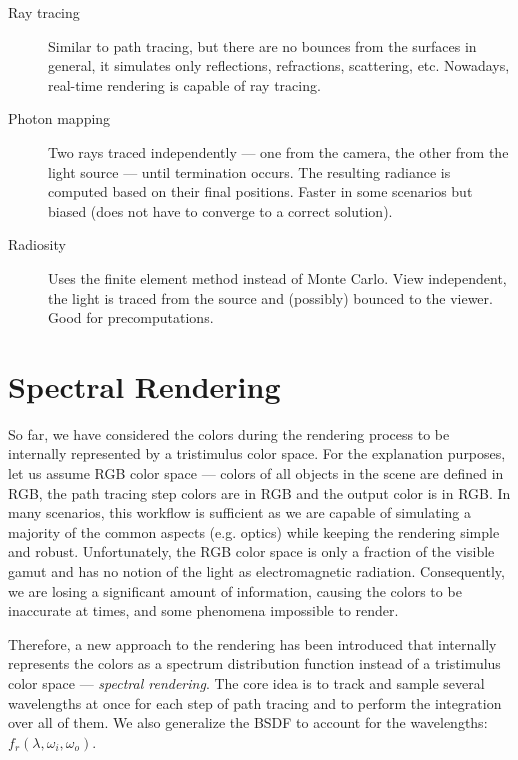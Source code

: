 \begin{description}
	\item[Ray tracing~\cite{glassner1989introduction}] Similar to path tracing, but there are no bounces from the surfaces in general, it simulates only reflections, refractions, scattering, etc. Nowadays, real-time rendering is capable of ray tracing.
	\item[Photon mapping~\cite{jensen2001realistic}] Two rays traced independently --- one from the camera, the other from the light source --- until termination occurs. The resulting radiance is computed based on their final positions. Faster in some scenarios but biased (does not have to converge to a correct solution).
	\item[Radiosity~\cite{sillion1994radiosity}] Uses the finite element method instead of Monte Carlo. View independent, the light is traced from the source and (possibly) bounced to the viewer. Good for precomputations. 
\end{description}

\section{Spectral Rendering}

So far, we have considered the colors during the rendering process to be internally represented by a tristimulus color space. For the explanation purposes, let us assume RGB color space --- colors of all objects in the scene are defined in RGB, the path tracing step colors are in RGB and the output color is in RGB. In many scenarios, this workflow is sufficient as we are capable of simulating a majority of the common aspects (e.g. optics) while keeping the rendering simple and robust. Unfortunately, the RGB color space is only a fraction of the visible gamut and has no notion of the light as electromagnetic radiation. Consequently, we are losing a significant amount of information, causing the colors to be inaccurate at times, and some phenomena impossible to render. 

Therefore, a new approach to the rendering has been introduced that internally represents the colors as a spectrum distribution function instead of a tristimulus color space --- \emph{spectral rendering}. The core idea is to track and sample several wavelengths at once for each step of path tracing and to perform the integration over all of them. We also generalize the BSDF to account for the wavelengths: $f_r(\lambda,\omega_i,\omega_o)$.

